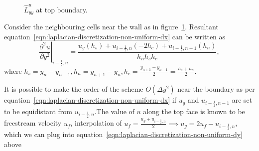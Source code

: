 \documentclass{article}
\begin{document}
\begin{figure}[h]
  \caption{$\hat{L}^u_{yy}$ at top boundary.}\label{fig:luxx-top}
\end{figure}

Consider the neighbouring cells near the wall as in figure~\ref{fig:luxx-top}. Resultant equation~\eqref{eqn:laplacian-discretization-non-uniform-dx}  can be written as
\begin{equation}\label{eqn:laplacian-discretization-non-uniform-dy}
\left.\frac{\partial^2 u}{\partial y^2}\right|_{i-\frac{1}{2},n}=\frac{u_g\left(h_s\right)+u_{i-\frac{1}{2},n}\left(-2 h_c\right)+u_{i-\frac{1}{2},n-1}\left(h_n\right)}{h_n h_s h_c},
\end{equation}
where $h_s=y_{n}-y_{n-1}, h_n = y_{n+1}-y_n, h_c = \frac{y_{n+1}-y_{n-1}}{2}=\frac{h_s+h_n}{2}$.

It is possible to make the order of the scheme $O(\Delta y^2)$ near the boundary as per equation~\eqref{eqn:laplacian-discretization-non-uniform-dx} if $u_g$ and $u_{i-\frac{1}{2},n-1}$ are set to be equidistant from $u_{i-\frac{1}{2},n}$.The value of $u$ along the top face is known to be freestream velocity $u_{{f}}$, interpolation of $u_{f} = \frac{u_g+u_{i-\frac{1}{2},n}}{2}\implies u_g=2u_{f}-u_{i-\frac{1}{2},n}$, which we can plug into equation~\eqref{eqn:laplacian-discretization-non-uniform-dy} above
\end{document}
